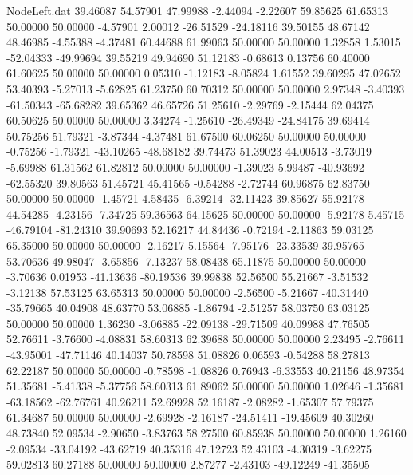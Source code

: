 \begin{filecontents}{NodeLeft.dat}
  39.46087   54.57901   47.99988    -2.44094   -2.22607   59.85625   61.65313   50.00000   50.00000   -4.57901    2.00012  -26.51529  -24.18116
  39.50155   48.67142   48.46985    -4.55388   -4.37481   60.44688   61.99063   50.00000   50.00000    1.32858    1.53015  -52.04333  -49.99694
  39.55219   49.94690   51.12183    -0.68613    0.13756   60.40000   61.60625   50.00000   50.00000    0.05310   -1.12183   -8.05824    1.61552
  39.60295   47.02652   53.40393    -5.27013   -5.62825   61.23750   60.70312   50.00000   50.00000    2.97348   -3.40393  -61.50343  -65.68282
  39.65362   46.65726   51.25610    -2.29769   -2.15444   62.04375   60.50625   50.00000   50.00000    3.34274   -1.25610  -26.49349  -24.84175
  39.69414   50.75256   51.79321    -3.87344   -4.37481   61.67500   60.06250   50.00000   50.00000   -0.75256   -1.79321  -43.10265  -48.68182
  39.74473   51.39023   44.00513    -3.73019   -5.69988   61.31562   61.82812   50.00000   50.00000   -1.39023    5.99487  -40.93692  -62.55320
  39.80563   51.45721   45.41565    -0.54288   -2.72744   60.96875   62.83750   50.00000   50.00000   -1.45721    4.58435   -6.39214  -32.11423
  39.85627   55.92178   44.54285    -4.23156   -7.34725   59.36563   64.15625   50.00000   50.00000   -5.92178    5.45715  -46.79104  -81.24310
  39.90693   52.16217   44.84436    -0.72194   -2.11863   59.03125   65.35000   50.00000   50.00000   -2.16217    5.15564   -7.95176  -23.33539
  39.95765   53.70636   49.98047    -3.65856   -7.13237   58.08438   65.11875   50.00000   50.00000   -3.70636    0.01953  -41.13636  -80.19536
  39.99838   52.56500   55.21667    -3.51532   -3.12138   57.53125   63.65313   50.00000   50.00000   -2.56500   -5.21667  -40.31440  -35.79665
  40.04908   48.63770   53.06885    -1.86794   -2.51257   58.03750   63.03125   50.00000   50.00000    1.36230   -3.06885  -22.09138  -29.71509
  40.09988   47.76505   52.76611    -3.76600   -4.08831   58.60313   62.39688   50.00000   50.00000    2.23495   -2.76611  -43.95001  -47.71146
  40.14037   50.78598   51.08826     0.06593   -0.54288   58.27813   62.22187   50.00000   50.00000   -0.78598   -1.08826    0.76943   -6.33553
  40.21156   48.97354   51.35681    -5.41338   -5.37756   58.60313   61.89062   50.00000   50.00000    1.02646   -1.35681  -63.18562  -62.76761
  40.26211   52.69928   52.16187    -2.08282   -1.65307   57.79375   61.34687   50.00000   50.00000   -2.69928   -2.16187  -24.51411  -19.45609
  40.30260   48.73840   52.09534    -2.90650   -3.83763   58.27500   60.85938   50.00000   50.00000    1.26160   -2.09534  -33.04192  -43.62719
  40.35316   47.12723   52.43103    -4.30319   -3.62275   59.02813   60.27188   50.00000   50.00000    2.87277   -2.43103  -49.12249  -41.35505

\end{filecontents}
